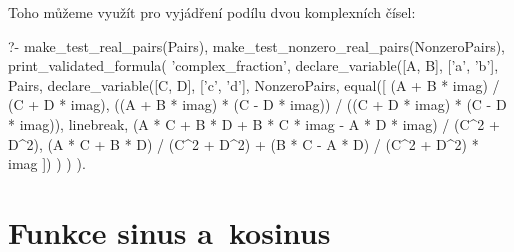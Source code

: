 Toho můžeme využít pro vyjádření podílu dvou komplexních čísel:

\begin{prolog}
?-	make_test_real_pairs(Pairs),
	make_test_nonzero_real_pairs(NonzeroPairs),
	print_validated_formula(
		'complex_fraction',
		declare_variable([A, B], ['a', 'b'], Pairs,
			declare_variable([C, D], ['c', 'd'], NonzeroPairs,
				equal([
					(A + B * imag) / (C + D * imag),
					((A + B * imag) * (C - D * imag)) / ((C + D * imag) * (C - D * imag)),
					linebreak,
					(A * C + B * D + B * C * imag - A * D * imag) / (C^2 + D^2),
					(A * C + B * D) / (C^2 + D^2) + (B * C - A * D) / (C^2 + D^2) * imag
				])
			)
		)
	).
\end{prolog}

\section{Funkce sinus a~kosinus}
